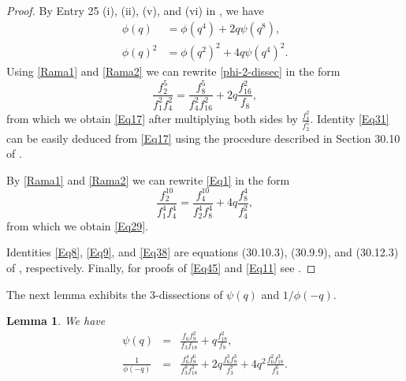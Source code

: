 \documentclass[12pt]{article}
\newtheorem{lemma}{Lemma}[section]
\begin{document}
\begin{proof}
By Entry 25 (i), (ii), (v), and (vi) in \cite[p. 40]{Berndt}, we have
\begin{align}
\phi(q) & = \phi(q^4) + 2q\psi(q^8),
\label{phi-2-dissec} \\
\phi(q)^2 & = \phi(q^2)^2 + 4q\psi(q^4)^2.
\label{phi^2-2-dissec}
\end{align} 
Using \eqref{Rama1} and \eqref{Rama2} we can rewrite \eqref{phi-2-dissec} in the form
\begin{equation*}
\frac{f_{2}^{5}}{f_{1}^{2}f_{4}^{2}} = \frac{f_{8}^{5}}{f_{4}^{2}f_{16}^{2}} + 2q\frac{f_{16}^{2}}{f_{8}},
\end{equation*}
from which we obtain \eqref{Eq17} after multiplying both sides by $\frac{f_4^2}{f_2^5}$. Identity \eqref{Eq31} can be easily deduced from \eqref{Eq17} using the procedure described in Section 30.10 of \cite{H}.

By \eqref{Rama1} and \eqref{Rama2} we can rewrite \eqref{Eq1} in the form
\begin{equation*}
\frac{f_{2}^{10}}{f_{1}^{4}f_{4}^{4}} = \frac{f_{4}^{10}}{f_{2}^{4}f_{8}^{4}} + 4q\frac{f_{8}^{4}}{f_{4}^{2}},
\end{equation*}
from which we obtain \eqref{Eq29}.

Identities \eqref{Eq8}, \eqref{Eq9}, and \eqref{Eq38} are equations (30.10.3), (30.9.9), and (30.12.3) of \cite{H}, respectively. Finally, for proofs of \eqref{Eq45} and \eqref{Eq11} see \cite[Lemma 4]{Naika}.
\end{proof}

The next lemma exhibits the 3-dissections of $\psi(q)$ and $1/\phi(-q)$.

\begin{lemma} We have
\begin{eqnarray}
\psi(q) & = & \displaystyle\frac{f_{6}f_{9}^{2}}{f_{3}f_{18}} + q\displaystyle\frac{f_{18}^{2}}{f_{9}}, \label{3_dissec_psi} \\
\displaystyle\frac{1}{\phi(-q)} & = & \displaystyle\frac{f_{6}^4f_{9}^6}{f_{3}^8f_{18}^3} + 2q\displaystyle\frac{f_{6}^3f_{9}^3}{f_{3}^7} + 4q^2\displaystyle\frac{f_{6}^2f_{18}^3}{f_{3}^6}. \label{3_dissec_1/phi}
\end{eqnarray}
\label{lemma2}
\end{lemma}
\end{document}
